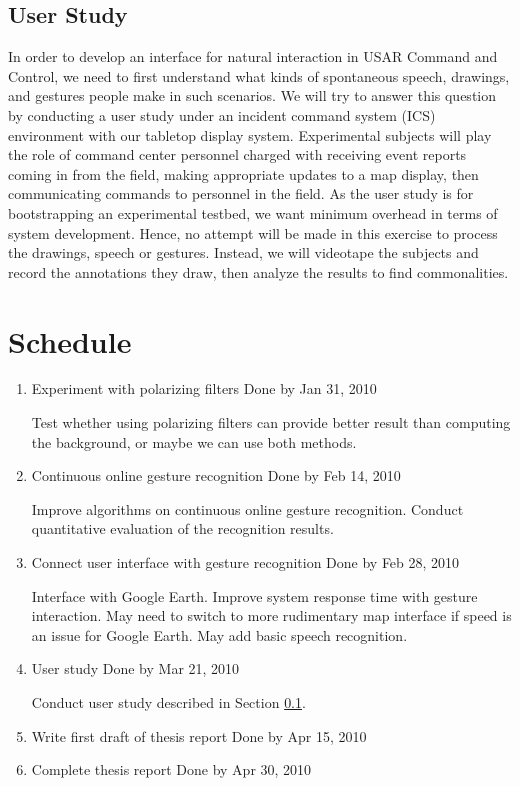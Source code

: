 \subsection{User Study}\label{sec:userStudy}
In order to develop an interface for natural interaction in USAR Command and Control, we need to first understand what kinds of spontaneous speech, drawings, and gestures people make in such scenarios. We will try to answer this question by conducting a user study under an incident command system (ICS) environment with our tabletop display system. Experimental subjects will play the role of command center personnel charged with receiving event reports coming in from the field, making appropriate updates to a map display, then communicating commands to personnel in the field. As the user study is for bootstrapping an experimental testbed, we want minimum overhead in terms of system development. Hence, no attempt will be made in this exercise to process the drawings, speech or gestures. Instead, we will videotape the subjects and record the annotations they draw, then analyze the results to find commonalities. 

\section{Schedule}
\begin{enumerate}
	\item Experiment with polarizing filters \hfill Done by Jan 31, 2010
	
	Test whether using polarizing filters can provide better result than computing the background, or maybe we can use both methods.
	
	\item Continuous online gesture recognition \hfill Done by Feb 14, 2010
	
	Improve algorithms on continuous online gesture recognition. Conduct quantitative evaluation of the recognition results. 
	
	\item Connect user interface with gesture recognition	\hfill Done by Feb 28, 2010
	
	Interface with Google Earth. Improve system response time with gesture interaction. May need to switch to more rudimentary map interface if speed is an issue for Google Earth. May add basic speech recognition.
	 
	\item User study \hfill Done by Mar 21, 2010
	
	Conduct user study described in Section \ref{sec:userStudy}.
	
	\item Write first draft of thesis report \hfill Done by Apr 15, 2010
	\item Complete thesis report	\hfill Done by Apr 30, 2010
	\end{enumerate}
	
